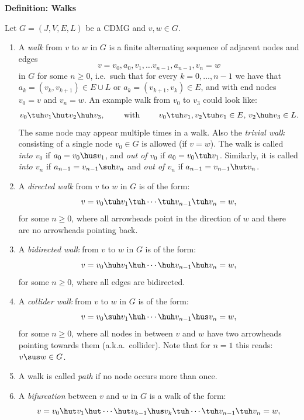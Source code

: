 \noindent\textbf{Definition: Walks}\par\smallskip
{\appendixTexSize
\label{def:walks}
     Let $G=(J,V,E,L)$ be a CDMG and $v,w \in G$.
\begin{enumerate}
    \item A \emph{walk} from $v$ to $w$ in $G$ is a finite alternating sequence of adjacent nodes and edges 
      \[v=v_0, a_0,  v_1, \dots v_{n-1}, a_{n-1}, v_n=w\] 
        in $G$ for some $n \ge 0$, i.e.\ such that for every $k=0,\dots,n-1$ 
        we have that $a_k = (v_k, v_{k+1}) \in E \cup L$ or $a_k = (v_{k+1}, v_k) \in E$, and with end nodes $v_0=v$ and $v_n=w$.
        An example walk from $v_0$ to $v_3$ could look like:
        \[v_0 \tuh v_1 \hut  v_2 \huh v_3, \qquad\text{ with } \qquad  v_0 \tuh v_1, v_2 \tuh v_1 \in E,\,v_2 \huh v_3 \in L. \]
        The same node may appear multiple times in a walk.
        Also the \emph{trivial walk} consisting of a single node $v_0 \in G$ is allowed (if $v=w$).
        The walk is called \emph{into $v_0$} if $a_0 = v_0 \hus v_1$, and \emph{out of $v_0$} if $a_0 = v_0 \tuh v_1$.
        Similarly, it is called \emph{into $v_n$} if $a_{n-1} = v_{n-1} \suh v_n$ and \emph{out of $v_n$} if $a_{n-1} = v_{n-1} \hut v_n$.
    \item A \emph{directed walk} from $v$ to $w$ in $G$ is of the form:
        \[v=v_0 \tuh v_1 \tuh  \cdots \tuh v_{n-1} \tuh v_n=w,\]
        for some $n \ge 0$,
        where all arrowheads point in the direction of $w$ and there are no arrowheads pointing back.
    \item A \emph{bidirected walk} from $v$ to $w$ in $G$ is of the form:
        \[v=v_0 \huh v_1 \huh  \cdots \huh v_{n-1} \huh v_n=w,\]
        for some $n \ge 0$, where all edges are bidirected.
    \item A \emph{collider walk} from $v$ to $w$ in $G$ is of the form:
        \[v=v_0 \suh v_1 \huh  \cdots \huh v_{n-1} \hus v_n=w,\]
        for some $n \ge 0$, where all nodes in between $v$ and $w$ have two arrowheads pointing towards them (a.k.a.\ collider).
        Note that for $n=1$ this reads: $v\sus w \in G$.
    \item A walk is called \emph{path} if no node occurs more than once.
    \item A \emph{bifurcation} between $v$ and $w$ in $G$ is a walk of the form:
        \[v=v_0 \hut v_1 \hut  \cdots \hut v_{k-1} \hus v_k  \tuh \cdots \tuh v_{n-1} \tuh v_n=w,\]

\end{enumerate}}

